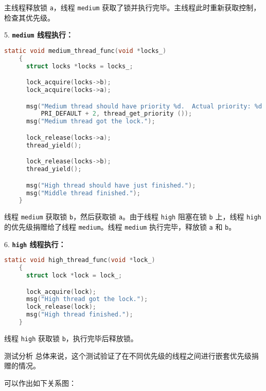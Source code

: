 \documentclass{beamer}
\begin{document}
\begin{frame}
  主线程释放锁 \texttt{a}，线程 \texttt{medium} 获取了锁并执行完毕。主线程此时重新获取控制，检查其优先级。

  5. \textbf{\texttt{medium} 线程执行：}
  \begin{lstlisting}[language=C]
    static void medium_thread_func(void *locks_) 
    {
      struct locks *locks = locks_;

      lock_acquire(locks->b);
      lock_acquire(locks->a);

      msg("Medium thread should have priority %d.  Actual priority: %d.",
          PRI_DEFAULT + 2, thread_get_priority ());
      msg("Medium thread got the lock.");

      lock_release(locks->a);
      thread_yield();

      lock_release(locks->b);
      thread_yield();

      msg("High thread should have just finished.");
      msg("Middle thread finished.");
    }
\end{lstlisting}

  线程 \texttt{medium} 获取锁 \texttt{b}，然后获取锁 \texttt{a}。由于线程 \texttt{high} 阻塞在锁 \texttt{b} 上，线程 \texttt{high} 的优先级捐赠给了线程 \texttt{medium}。线程 \texttt{medium} 执行完毕，释放锁 \texttt{a} 和 \texttt{b}。

  6. \textbf{\texttt{high} 线程执行：}
  \begin{lstlisting}[language=C]
    static void high_thread_func(void *lock_) 
    {
      struct lock *lock = lock_;

      lock_acquire(lock);
      msg("High thread got the lock.");
      lock_release(lock);
      msg("High thread finished.");
    }
\end{lstlisting}

  线程 \texttt{high} 获取锁 \texttt{b}，执行完毕后释放锁。

  \framebreak

  \begin{block}{测试分析}
    总体来说，这个测试验证了在不同优先级的线程之间进行嵌套优先级捐赠的情况。
  \end{block}

  可以作出如下关系图：

  \begin{figure}[H]
    \centering
\end{figure}
\end{frame}
\end{document}
